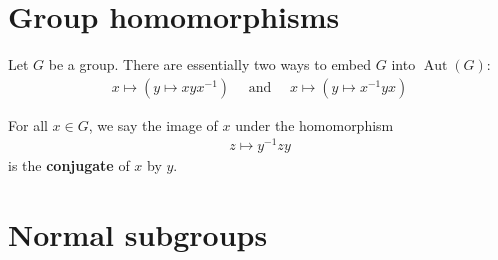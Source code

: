 \documentclass{report}
\begin{document}
\section{Group homomorphisms}
Let $G$ be a group. There are essentially two ways to embed $G$ into $\operatorname{Aut}(G)$: 
\begin{align*}
x \mapsto  \left( y \mapsto  xyx^{-1} \right)\quad \text{ and }\quad x\mapsto \left( y \mapsto x^{-1}yx  \right)
\end{align*}



For all $x \in G$, we say the image of $x$ under the homomorphism 
\begin{align*}
z \mapsto y^{-1}zy
\end{align*}
is the \textbf{conjugate} of $x$ by $y$. 
\section{Normal subgroups}
\end{document}
